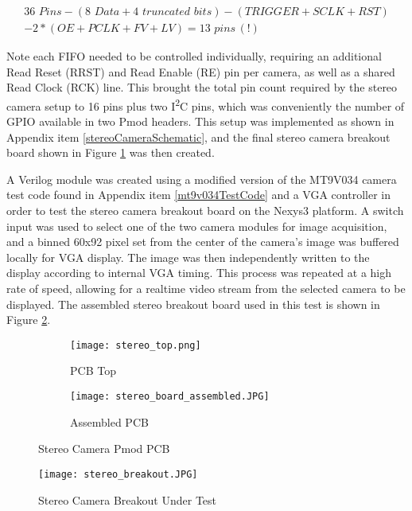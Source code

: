 \begin{equation}
\label{lowerPincount}
\begin{split}
36\,\, Pins - (8\,\,Data + 4 \,\,truncated\,\,bits) - (TRIGGER+SCLK+RST) \\ - 2*(OE+PCLK+FV+LV) = 13\,\,pins\,(!) 
\end{split}
\end{equation}
\par
Note each FIFO needed to be controlled individually, requiring an additional Read Reset (RRST) and Read Enable (RE) pin per camera, as well as a shared Read Clock (RCK) line. This brought the total pin count required by the stereo camera setup to 16 pins plus two I\textsuperscript{2}C pins, which was conveniently the number of GPIO available in two Pmod headers. This setup was implemented as shown in Appendix item \ref{stereoCameraSchematic}, and the final stereo camera breakout board shown in Figure \ref{stereoCameraBoard} was then created.  
\par
A Verilog module was created using a modified version of the MT9V034 camera test code found in Appendix item \ref{mt9v034TestCode} and a VGA controller in order to test the stereo camera breakout board on the Nexys3 platform. A switch input was used to select one of the two camera modules for image acquisition, and a binned 60x92 pixel set from the center of the camera's image was buffered locally for VGA display. The image was then independently written to the display according to internal VGA timing. This process was repeated at a high rate of speed, allowing for a realtime video stream from the selected camera to be displayed. The assembled stereo breakout board used in this test is shown in Figure \ref{stereoTestSetup}.
\begin{figure}[H] 
	\begin{subfigure}{1\textwidth}
	\centering
		\texttt{[image: stereo\_top.png]}
		\caption{PCB Top}
	\end{subfigure}
	\begin{subfigure}{1\textwidth}
	\centering
		\texttt{[image: stereo\_board\_assembled.JPG]}
		\caption{Assembled PCB}
	\end{subfigure}
	\caption{Stereo Camera Pmod PCB}
	\label{stereoCameraBoard}
\end{figure}
\par
\begin{figure}[H] 
	\centering
	\texttt{[image: stereo\_breakout.JPG]}
	\caption{Stereo Camera Breakout Under Test}
	\label{stereoTestSetup}
\end{figure}
